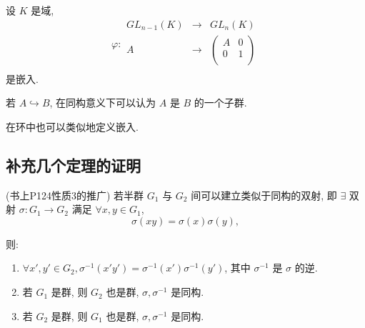 \documentclass[color=black,device=normal,lang=cn,mode=geye]{elegantnote}
\begin{document}
\begin{example}
    设 $K$ 是域,
    \[\varphi:\begin{array}{rcl}
        GL _{n-1}(K) & \to & GL _n(K) \\
        A & \to & \begin{pmatrix}
            A & 0 \\
            0 & 1 \\
        \end{pmatrix} \\
    \end{array}\]
    是嵌入.
\end{example}
若 $A\hookrightarrow B$, 在同构意义下可以认为 $A$ 是 $B$ 的一个子群.

在环中也可以类似地定义嵌入.
\subsection{补充几个定理的证明}
\begin{theorem}(书上P124性质3的推广)\label{t2.1}
    若半群 $G_1$ 与 $G_2$ 间可以建立类似于同构的双射, 即 $\exists$ 双射 $\sigma:G_1\to G_2$ 满足 $\forall x,y\in G_1$,
    \begin{equation}\label{eq2.1}
        \sigma(xy)=\sigma(x)\sigma(y),
    \end{equation}

    则:
    \begin{enumerate}
        \def\labelenumi{(\arabic{enumi})}
        \item $\forall x',y'\in G_2,\sigma^{-1}(x'y')=\sigma^{-1}(x')\sigma^{-1}(y')$, 其中 $\sigma^{-1}$ 是 $\sigma$ 的逆.
        \item 若 $G_1$ 是群, 则 $G_2$ 也是群, $\sigma,\sigma^{-1}$ 是同构.
        \item 若 $G_2$ 是群, 则 $G_1$ 也是群, $\sigma,\sigma^{-1}$ 是同构.
    \end{enumerate}
\end{theorem}
\end{document}
